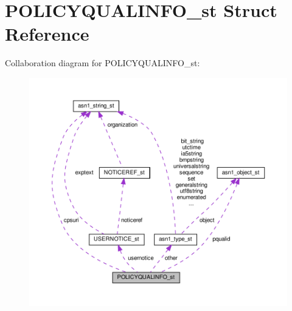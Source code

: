 \hypertarget{structPOLICYQUALINFO__st}{}\section{P\+O\+L\+I\+C\+Y\+Q\+U\+A\+L\+I\+N\+F\+O\+\_\+st Struct Reference}
\label{structPOLICYQUALINFO__st}


Collaboration diagram for P\+O\+L\+I\+C\+Y\+Q\+U\+A\+L\+I\+N\+F\+O\+\_\+st\+:
\nopagebreak
\begin{figure}[H]
\begin{center}
\leavevmode
\includegraphics[width=350pt]{structPOLICYQUALINFO__st__coll__graph}
\end{center}
\end{figure}

